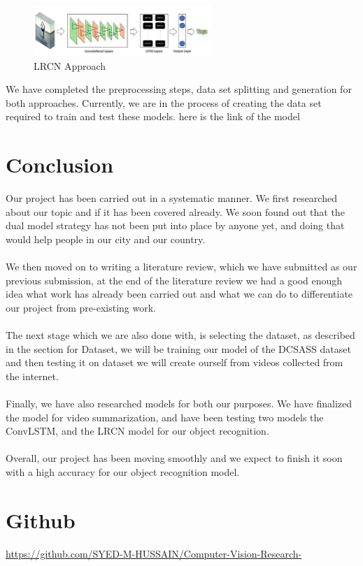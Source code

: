 \documentclass[title page]{article}
\begin{document}
\begin{figure}[h]
    \centering
    \includegraphics[width=0.6\textwidth]{Picture3.jpg}
    \caption{LRCN Approach}
    \label{fig:3}
\end{figure}

We have completed the preprocessing steps, data set splitting and generation for both approaches. Currently, we are in the process of creating the data set required to train and test these models. here is the link of the model 

\section{Conclusion}

Our project has been carried out in a systematic manner. We first researched about our topic and if it has been covered already. We soon found out that the dual model strategy has not been put into place by anyone yet, and doing that would help people in our city and our country. 
\\ \\
We then moved on to writing a literature review, which we have submitted as our previous submission, at the end of the literature review we had a good enough idea what work has already been carried out and what we can do to differentiate our project from pre-existing work. 
\\ \\
The next stage which we are also done with, is selecting the dataset, as described in the section for Dataset, we will be training our model of the DCSASS dataset and then testing it on dataset we will create ourself from videos collected from the internet.
\\ \\
Finally, we have also researched models for both our purposes. We have finalized the model for video summarization, and have been testing two models the ConvLSTM, and the LRCN model for our object recognition. 
\\ \\
Overall, our project has been moving smoothly and we expect to finish it soon with a high accuracy for our object recognition model. 

\section{Github}

\href{https://github.com/SYED-M-HUSSAIN/Computer-Vision-Research-}{https://github.com/SYED-M-HUSSAIN/Computer-Vision-Research-}
\end{document}
